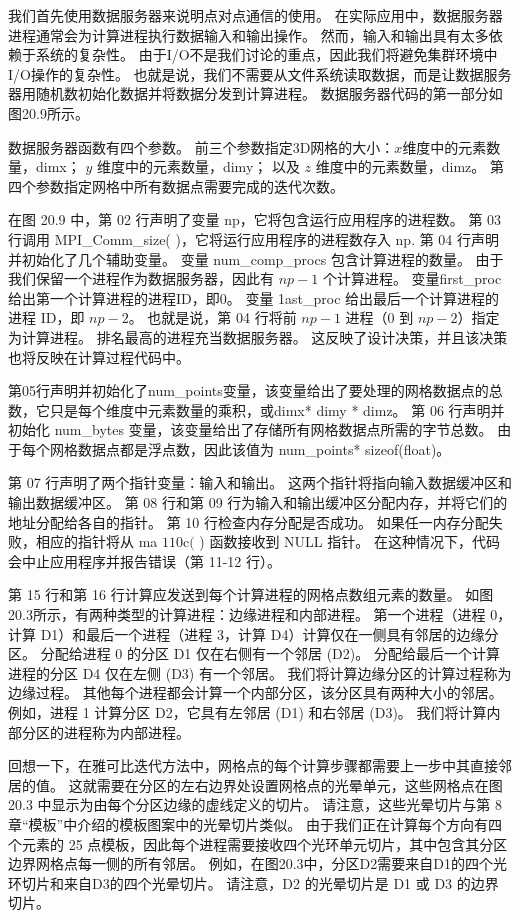 我们首先使用数据服务器来说明点对点通信的使用。 在实际应用中，数据服务器进程通常会为计算进程执行数据输入和输出操作。 然而，输入和输出具有太多依赖于系统的复杂性。 由于I/O不是我们讨论的重点，因此我们将避免集群环境中I/O操作的复杂性。 也就是说，我们不需要从文件系统读取数据，而是让数据服务器用随机数初始化数据并将数据分发到计算进程。 数据服务器代码的第一部分如图20.9所示。

数据服务器函数有四个参数。 前三个参数指定3D网格的大小：$x$维度中的元素数量，dimx； $y$ 维度中的元素数量，dimy； 以及 $z$ 维度中的元素数量，dimz。 第四个参数指定网格中所有数据点需要完成的迭代次数。

在图 20.9 中，第 02 行声明了变量 np，它将包含运行应用程序的进程数。 第 03 行调用 MPI\_Comm\_size( )，它将运行应用程序的进程数存入 np. 第 04 行声明并初始化了几个辅助变量。 变量 num\_comp\_procs 包含计算进程的数量。 由于我们保留一个进程作为数据服务器，因此有 $n p-1$ 个计算进程。 变量first\_proc给出第一个计算进程的进程ID，即0。 变量 1ast\_proc 给出最后一个计算进程的进程 ID，即 $n p-2$。 也就是说，第 04 行将前 $n p-1$ 进程（0 到 $n p-2$）指定为计算进程。 排名最高的进程充当数据服务器。 这反映了设计决策，并且该决策也将反映在计算过程代码中。

第05行声明并初始化了num\_points变量，该变量给出了要处理的网格数据点的总数，它只是每个维度中元素数量的乘积，或dimx* dimy * dimz。 第 06 行声明并初始化 num\_bytes 变量，该变量给出了存储所有网格数据点所需的字节总数。 由于每个网格数据点都是浮点数，因此该值为 num\_points* sizeof(float)。

第 07 行声明了两个指针变量：输入和输出。 这两个指针将指向输入数据缓冲区和输出数据缓冲区。 第 08 行和第 09 行为输入和输出缓冲区分配内存，并将它们的地址分配给各自的指针。 第 10 行检查内存分配是否成功。 如果任一内存分配失败，相应的指针将从 ma $110 \mathrm{c}($ ) 函数接收到 NULL 指针。 在这种情况下，代码会中止应用程序并报告错误（第 11-12 行）。

第 15 行和第 16 行计算应发送到每个计算进程的网格点数组元素的数量。 如图20.3所示，有两种类型的计算进程：边缘进程和内部进程。 第一个进程（进程 0，计算 D1）和最后一个进程（进程 3，计算 D4）计算仅在一侧具有邻居的边缘分区。 分配给进程 0 的分区 D1 仅在右侧有一个邻居 (D2)。 分配给最后一个计算进程的分区 D4 仅在左侧 (D3) 有一个邻居。 我们将计算边缘分区的计算过程称为边缘过程。 其他每个进程都会计算一个内部分区，该分区具有两种大小的邻居。 例如，进程 1 计算分区 D2，它具有左邻居 (D1) 和右邻居 (D3)。 我们将计算内部分区的进程称为内部进程。

回想一下，在雅可比迭代方法中，网格点的每个计算步骤都需要上一步中其直接邻居的值。 这就需要在分区的左右边界处设置网格点的光晕单元，这些网格点在图 20.3 中显示为由每个分区边缘的虚线定义的切片。 请注意，这些光晕切片与第 8 章“模板”中介绍的模板图案中的光晕切片类似。 由于我们正在计算每个方向有四个元素的 25 点模板，因此每个进程需要接收四个光环单元切片，其中包含其分区边界网格点每一侧的所有邻居。 例如，在图20.3中，分区D2需要来自D1的四个光环切片和来自D3的四个光晕切片。 请注意，D2 的光晕切片是 D1 或 D3 的边界切片。

